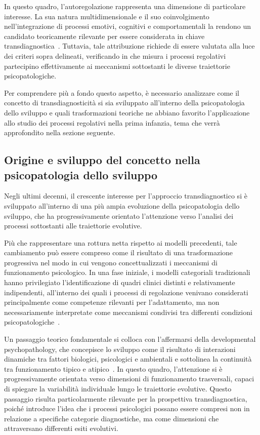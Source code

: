             In questo quadro, l'autoregolazione rappresenta una dimensione di particolare interesse. La sua natura multidimensionale e il suo coinvolgimento nell'integrazione di processi emotivi, cognitivi e comportamentali la rendono un candidato teoricamente rilevante per essere considerata in chiave transdiagnostica~\cite{beauchaine2015}. Tuttavia, tale attribuzione richiede di essere valutata alla luce dei criteri sopra delineati, verificando in che misura i processi regolativi partecipino effettivamente ai meccanismi sottostanti le diverse traiettorie psicopatologiche.

            Per comprendere più a fondo questo aspetto, è necessario analizzare come il concetto di transdiagnosticità si sia sviluppato all'interno della psicopatologia dello sviluppo e quali trasformazioni teoriche ne abbiano favorito l'applicazione allo studio dei processi regolativi nella prima infanzia, tema che verrà approfondito nella sezione seguente.

        \subsection{Origine e sviluppo del concetto nella psicopatologia dello sviluppo}
        \label{sec:2_2_2}

            Negli ultimi decenni, il crescente interesse per l'approccio transdiagnostico si è sviluppato all'interno di una più ampia evoluzione della psicopatologia dello sviluppo, che ha progressivamente orientato l'attenzione verso l'analisi dei processi sottostanti alle traiettorie evolutive.

            Più che rappresentare una rottura netta rispetto ai modelli precedenti, tale cambiamento può essere compreso come il risultato di una trasformazione progressiva nel modo in cui vengono concettualizzati i meccanismi di funzionamento psicologico. In una fase iniziale, i modelli categoriali tradizionali hanno privilegiato l'identificazione di quadri clinici distinti e relativamente indipendenti, all'interno dei quali i processi di regolazione venivano considerati principalmente come competenze rilevanti per l'adattamento, ma non necessariamente interpretate come meccanismi condivisi tra differenti condizioni psicopatologiche~\cite{beauchaine2019}.

            Un passaggio teorico fondamentale si colloca con l'affermarsi della developmental psychopathology, che concepisce lo sviluppo come il risultato di interazioni dinamiche tra fattori biologici, psicologici e ambientali e sottolinea la continuità tra funzionamento tipico e atipico~\cite{cicchetti2006}. In questo quadro, l'attenzione si è progressivamente orientata verso dimensioni di funzionamento trasversali, capaci di spiegare la variabilità individuale lungo le traiettorie evolutive. Questo passaggio risulta particolarmente rilevante per la prospettiva transdiagnostica, poiché introduce l'idea che i processi psicologici possano essere compresi non in relazione a specifiche categorie diagnostiche, ma come dimensioni che attraversano differenti esiti evolutivi.

